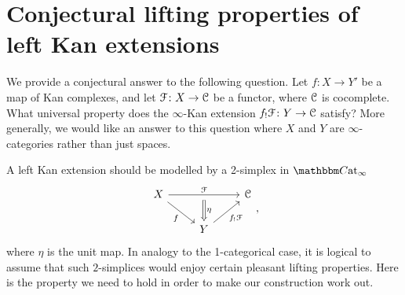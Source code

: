 \documentclass[main.tex]{subfiles}
\begin{document}
\section{Conjectural lifting properties of left Kan extensions}
\label{sec:con_extensions}

We provide a conjectural answer to the following question. Let $f\colon X \to Y'$ be a map of Kan complexes, and let $\mathcal{F}\colon X \to \mathcal{C}$ be a functor, where $\mathcal{C}$ is cocomplete. What universal property does the $\infty$-Kan extension $f_{!}\mathcal{F}\colon Y \to \mathcal{C}$ satisfy? More generally, we would like an answer to this question where $X$ and $Y$ are $\infty$-categories rather than just spaces.

A left Kan extension should be modelled by a 2-simplex in $\ICCat$
\begin{equation*}
  \label{eq:left_kan_ext}
  \begin{tikzcd}
    X
    \arrow[rr, "\mathcal{F}", ""{below, name=M}]
    \arrow[dr, swap, "f"]
    && \category{C}
    \\
    & Y
    \arrow[ur, swap, "f_{!}\mathcal{F}"]
    \arrow[from=M, Rightarrow, "\eta"]
  \end{tikzcd},
\end{equation*}
where $\eta$ is the unit map. In analogy to the 1-categorical case, it is logical to assume that such $2$-simplices would enjoy certain pleasant lifting properties. Here is the property we need to hold in order to make our construction work out.
\end{document}
